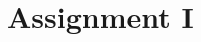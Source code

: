\documentclass[12pt]{article}
\begin{document}


\section{Assignment I}
\label{sec:assignment1}


\end{document}
